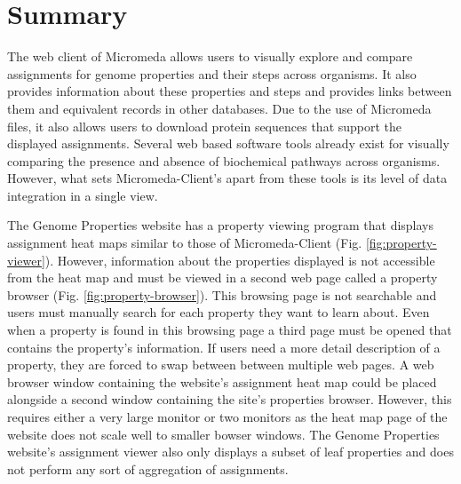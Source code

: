 \section{Summary} 

The web client of Micromeda allows users to visually explore and compare assignments for genome properties and their steps across organisms. It also provides information about these properties and steps and provides links between them and equivalent records in other databases. Due to the use of Micromeda files, it also allows users to download protein sequences that support the displayed assignments. Several web based software tools already exist for visually comparing the presence and absence of biochemical pathways across organisms. However, what sets Micromeda-Client's apart from these tools is its level of data integration in a single view. 

The Genome Properties website has a property viewing program that displays assignment heat maps similar to those of Micromeda-Client (Fig. \ref{fig:property-viewer}). However, information about the properties displayed is not accessible from the heat map and must be viewed in a second web page called a property browser (Fig. \ref{fig:property-browser}). This browsing page is not searchable and users must manually search for each property they want to learn about. Even when a property is found in this browsing page a third page must be opened that contains the property's information. If users need a more detail description of a property, they are forced to swap between between multiple web pages. A web browser window containing the website's assignment heat map could be placed alongside a second window containing the site's properties browser. However, this requires either a very large monitor or two monitors as the heat map page of the website does not scale well to smaller bowser windows. The Genome Properties website's assignment viewer also only displays a subset of leaf properties and does not perform any sort of aggregation of assignments.

